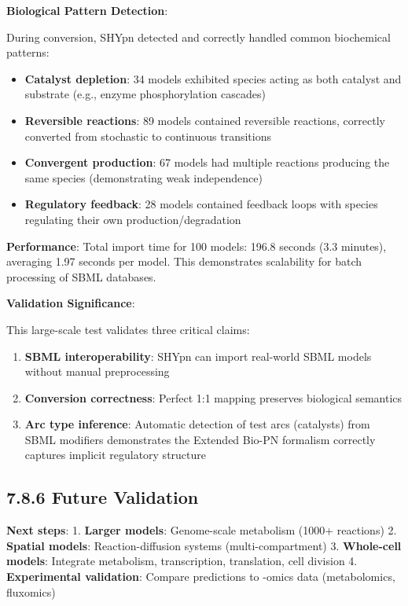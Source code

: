 \textbf{Biological Pattern Detection}:

During conversion, SHYpn detected and correctly handled common biochemical patterns:

\begin{itemize}
\item \textbf{Catalyst depletion}: 34 models exhibited species acting as both catalyst and substrate (e.g., enzyme phosphorylation cascades)
\item \textbf{Reversible reactions}: 89 models contained reversible reactions, correctly converted from stochastic to continuous transitions
\item \textbf{Convergent production}: 67 models had multiple reactions producing the same species (demonstrating weak independence)
\item \textbf{Regulatory feedback}: 28 models contained feedback loops with species regulating their own production/degradation
\end{itemize}

\textbf{Performance}: Total import time for 100 models: 196.8 seconds (3.3 minutes), averaging 1.97 seconds per model. This demonstrates scalability for batch processing of SBML databases.

\textbf{Validation Significance}:

This large-scale test validates three critical claims:

\begin{enumerate}
\item \textbf{SBML interoperability}: SHYpn can import real-world SBML models without manual preprocessing
\item \textbf{Conversion correctness}: Perfect 1:1 mapping preserves biological semantics
\item \textbf{Arc type inference}: Automatic detection of test arcs (catalysts) from SBML modifiers demonstrates the Extended Bio-PN formalism correctly captures implicit regulatory structure
\end{enumerate}

\hypertarget{future-validation}{%
\subsection{7.8.6 Future Validation}\label{future-validation}}

\textbf{Next steps}: 1. \textbf{Larger models}: Genome-scale metabolism
(1000+ reactions) 2. \textbf{Spatial models}: Reaction-diffusion systems
(multi-compartment) 3. \textbf{Whole-cell models}: Integrate metabolism,
transcription, translation, cell division 4. \textbf{Experimental
validation}: Compare predictions to -omics data (metabolomics,
fluxomics)

